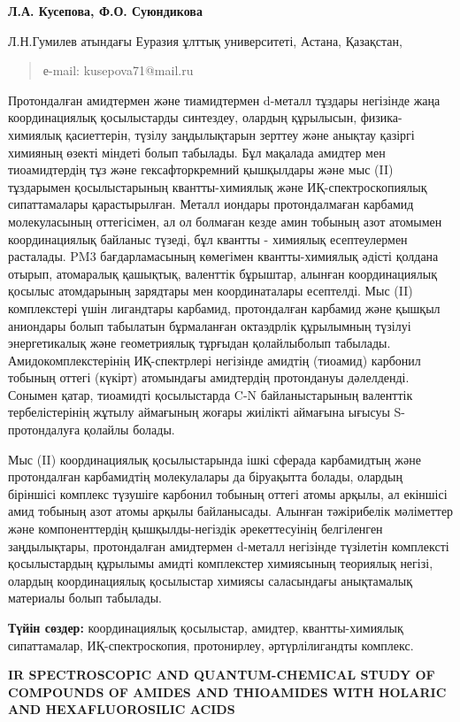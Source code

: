 \textbf{Л.А. Кусепова, Ф.О. Суюндикова}

Л.Н.Гумилев атындағы Еуразия ұлттық университеті, Астана, Қазақстан,

\begin{quote}
е-mail: kusepova71@mail.ru
\end{quote}

Протондалған амидтермен және тиамидтермен d-металл тұздары негізінде
жаңа координациялық қосылыстарды синтездеу, олардың құрылысын,
физика-химиялық қасиеттерін, түзілу заңдылықтарын зерттеу және анықтау
қазіргі химияның өзекті міндеті болып табылады. Бұл мақалада амидтер мен
тиоамидтердің тұз және гексафторкремний қышқылдары және мыс (II)
тұздарымен қосылыстарының квантты-химиялық және ИҚ-спектроскопиялық
сипаттамалары қарастырылған. Металл иондары протондалмаған карбамид
молекуласының оттегісімен, ал ол болмаған кезде амин тобының азот
атомымен координациялық байланыс түзеді, бұл квантты - химиялық
есептеулермен расталады. PM3 бағдарламасының көмегімен квантты-химиялық
әдісті қолдана отырып, атомаралық қашықтық, валенттік бұрыштар, алынған
координациялық қосылыс атомдарының зарядтары мен координаталары
есептелді. Мыс (II) комплекстері үшін лигандтары карбамид, протондалған
карбамид және қышқыл аниондары болып табылатын бұрмаланған октаэдрлік
құрылымның түзілуі энергетикалық және геометриялық тұрғыдан қолайлыболып
табылады. Амидокомплекстерінің ИҚ-спектрлері негізінде амидтің (тиоамид)
карбонил тобының оттегі (күкірт) атомындағы амидтердің протондануы
дәлелденді. Сонымен қатар, тиоамидті қосылыстарда C-N байланыстарының
валенттік тербелістерінің жұтылу аймағының жоғары жиілікті аймағына
ығысуы S-протондалуға қолайлы болады.

Мыс (II) координациялық қосылыстарында ішкі сферада карбамидтың және
протондалған карбамидтің молекулалары да біруақытта болады, олардың
біріншісі комплекс түзушіге карбонил тобының оттегі атомы арқылы, ал
екіншісі амид тобының азот атомы арқылы байланысады. Алынған тәжірибелік
мәліметтер және компоненттердің қышқылды-негіздік әрекеттесуінің
белгіленген заңдылықтары, протондалған амидтермен d-металл негізінде
түзілетін комплексті қосылыстардың құрылымы амидті комплекстер
химиясының теориялық негізі, олардың координациялық қосылыстар химиясы
саласындағы анықтамалық материалы болып табылады.

\textbf{Түйін сөздер:} координациялық қосылыстар, амидтер,
квантты-химиялық сипаттамалар, ИҚ-спектроскопия, протонирлеу,
әртүрлілигандты комплекс.

\textbf{IR SPECTROSCOPIC AND QUANTUM-CHEMICAL STUDY OF COMPOUNDS OF
AMIDES AND THIOAMIDES WITH HOLARIC AND HEXAFLUOROSILIC ACIDS}

